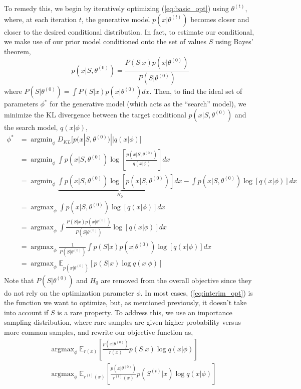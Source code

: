 \documentclass{article}
\DeclareMathOperator*{\argmin}{argmin}
\DeclareMathOperator*{\argmax}{argmax}
\begin{document}
To remedy this, we begin by iteratively optimizing (\ref{eq:basic_opt}) using
$\theta^{(t)}$, where, at each iteration $t$, the generative model
$p(x|\theta^{(t)})$ becomes closer and closer to the desired conditional
distribution. In fact, to estimate our conditional, we make use of our prior
model conditioned onto the set of values $S$ using Bayes' theorem,
%
\begin{equation}
  p(x|S, \theta^{(0)}) = \frac{P(S|x) p(x|\theta^{(0)})}{P(S|\theta^{(0)})} 
  \label{eq:bayes}
\end{equation}
%
where $P(S|\theta^{(0)}) = \int P(S|x) p(x|\theta^{(0)}) dx$. Then, to find the
ideal set of parameters $\phi^*$ for the generative model (which acts as the
``search'' model), we minimize the KL divergence between the target conditional
$p(x|S,\theta^{(0)})$ and the search model, $q(x|\phi)$,
%
\begin{align}
  \phi^*  &= \argmin_{\phi} D_{KL} \Big[ p(x|S,\theta^{(0)}) || q(x|\phi) \Big]
              \label{eq:kld_optim} \\
          &= \argmin_{\phi} \int p(x|S,\theta^{(0)}) \log 
              \left[ \frac{p(x|S,\theta^{(0)})}{q(x|\phi)} \right] dx \\
          &= \argmin_{\phi} \underbrace{\int p(x|S,\theta^{(0)})
              \log[p(x|S,\theta^{(0)})] dx}_{H_0}
              - \int p(x|S,\theta^{(0)}) \log[q(x|\phi)] dx \\
          &= \argmax_{\phi} \int p(x|S,\theta^{(0)}) \log[q(x|\phi)] dx \\
          &= \argmax_{\phi} \int \frac{P(S|x) p(x|\theta^{(0)})}
              {P(S|\theta^{(0)})} \log[q(x|\phi)] dx \\
          &= \argmax_{\phi} \frac{1}{P(S|\theta^{(0)})} \int p(S|x) 
              p(x|\theta^{(0)}) \log[q(x|\phi)] dx \\
          &= \argmax_{\phi} \mathbb{E}_{p(x|\theta^{(0)})} [p(S|x) 
              \log q(x|\phi)] \label{eq:interim_opt}
\end{align}
%
Note that $P(S|\theta^{(0)})$ and $H_0$ are removed from the overall objective
since they do not rely on the optimization parameter $\phi$. In most cases,
(\ref{eq:interim_opt}) is the function we want to optimize, but, as mentioned
previously, it doesn't take into account if $S$ is a rare property. To address
this, we use an importance sampling distribution, where rare samples are given
higher probability versus more common samples, and rewrite our objective
function as,
%
\begin{align}
  &\argmax_{\phi} \mathbb{E}_{r(x)} \left[ \frac{p(x|\theta^{(0)})}{r(x)}
    p(S|x) \log q(x|\phi) \right] \\
  &\argmax_{\phi} \mathbb{E}_{r^{(t)}(x)} \left[ \frac{p(x|\theta^{(0)})}{
    r^{(t)}(x)} p(S^{(t)}|x) \log q(x|\phi) \right] \label{eq:iter_opt}
\end{align}
\end{document}
